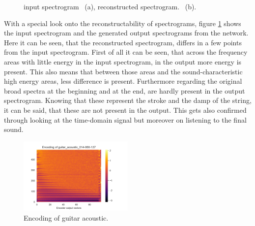 \begin{figure}[htb!]
    \centering
    \caption{input spectrogram ~(a), reconstructed spectrogram. ~(b).}
    \label{fig:res_1D_input_output}
\end{figure}

With a special look onto the reconstructability of spectrograms, figure \ref{fig:res_1D_input_output} shows the input spectrogram and the generated output spectrograms from the network. Here it can be seen, that the reconstructed spectrogram, differs in a few points from the input spectrogram. First of all it can be seen, that across the frequency areas with little energy in the input spectrogram, in the output more energy is present. This also means that between those areas and the sound-characteristic high energy areas, less difference is present. Furthermore regarding the original broad spectra at the beginning and at the end, are hardly present in the output spectrogram. Knowing that these represent the stroke and the damp of the string, it can be said, that these are not present in the output. This gets also confirmed through looking at the time-domain signal but moreover on listening to the final sound. 

\begin{figure}[htb!]
    \centering
    \includegraphics[width=0.5\textwidth]{images/results/emb_guitar_acoustic_014-060-127.png}
    \caption{Encoding of guitar acoustic.}
    \label{fig:res_1D_emb}
\end{figure}

